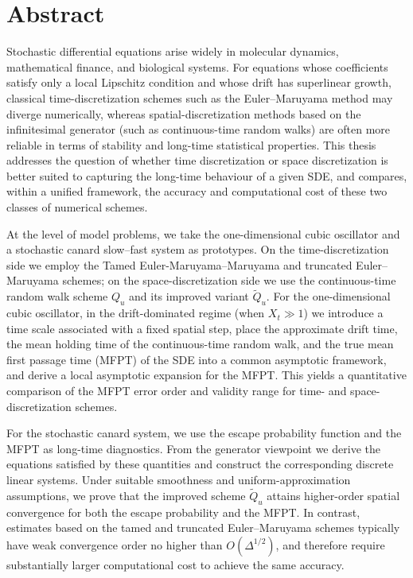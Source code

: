 	\newpage
	\section*{Abstract}
	\large %
	Stochastic differential equations arise widely in molecular dynamics, mathematical finance, and biological systems. For equations whose coefficients satisfy only a local Lipschitz condition and whose drift has superlinear growth, classical time-discretization schemes such as the Euler--Maruyama method may diverge numerically, whereas spatial-discretization methods based on the infinitesimal generator (such as continuous-time random walks) are often more reliable in terms of stability and long-time statistical properties. This thesis addresses the question of whether time discretization or space discretization is better suited to capturing the long-time behaviour of a given SDE, and compares, within a unified framework, the accuracy and computational cost of these two classes of numerical schemes.
	
	At the level of model problems, we take the one-dimensional cubic oscillator and a stochastic canard slow--fast system as prototypes. On the time-discretization side we employ the Tamed Euler-Maruyama--Maruyama and truncated Euler--Maruyama schemes; on the space-discretization side we use the continuous-time random walk scheme \(Q_u\) and its improved variant \(\widetilde Q_u\). For the one-dimensional cubic oscillator, in the drift-dominated regime (when \(X_t \gg 1\)) we introduce a time scale associated with a fixed spatial step, place the approximate drift time, the mean holding time of the continuous-time random walk, and the true mean first passage time (MFPT) of the SDE into a common asymptotic framework, and derive a local asymptotic expansion for the MFPT. This yields a quantitative comparison of the MFPT error order and validity range for time- and space-discretization schemes.
	
	For the stochastic canard system, we use the escape probability function and the MFPT as long-time diagnostics. From the generator viewpoint we derive the equations satisfied by these quantities and construct the corresponding discrete linear systems. Under suitable smoothness and uniform-approximation assumptions, we prove that the improved scheme \(\widetilde Q_u\) attains higher-order spatial convergence for both the escape probability and the MFPT. In contrast, estimates based on the tamed and truncated Euler--Maruyama schemes typically have weak convergence order no higher than \(O(\Delta^{1/2})\), and therefore require substantially larger computational cost to achieve the same accuracy.
	
